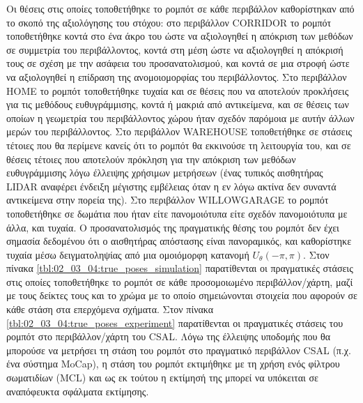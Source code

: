Οι θέσεις στις οποίες τοποθετήθηκε το ρομπότ σε κάθε περιβάλλον καθορίστηκαν
από το σκοπό της αξιολόγησης του στόχου: στο περιβάλλον CORRIDOR το ρομπότ
τοποθετήθηκε κοντά στο ένα άκρο του ώστε να αξιολογηθεί η απόκριση των μεθόδων
σε συμμετρία του περιβάλλοντος, κοντά στη μέση ώστε να αξιολογηθεί η απόκρισή
τους σε σχέση με την ασάφεια του προσανατολισμού, και κοντά σε μια στροφή ώστε
να αξιολογηθεί η επίδραση της ανομοιομορφίας του περιβάλλοντος. Στο περιβάλλον
HOME το ρομπότ τοποθετήθηκε τυχαία και σε θέσεις που να αποτελούν προκλήσεις
για τις μεθόδους ευθυγράμμισης, κοντά ή μακριά από αντικείμενα, και σε θέσεις
των οποίων η γεωμετρία του περιβάλλοντος χώρου ήταν σχεδόν παρόμοια με αυτήν
άλλων μερών του περιβάλλοντος. Στο περιβάλλον WAREHOUSE τοποθετήθηκε σε
στάσεις τέτοιες που θα περίμενε κανείς ότι το ρομπότ θα εκκινούσε τη λειτουργία
του, και σε θέσεις τέτοιες που αποτελούν πρόκληση για την απόκριση των μεθόδων
ευθυγράμμισης λόγω έλλειψης χρήσιμων μετρήσεων (ένας τυπικός αισθητήρας LIDAR
αναφέρει ένδειξη μέγιστης εμβέλειας όταν η εν λόγω ακτίνα δεν συναντά
αντικείμενα στην πορεία της). Στο περιβάλλον WILLOWGARAGE το ρομπότ
τοποθετήθηκε σε δωμάτια που ήταν είτε πανομοιότυπα είτε σχεδόν πανομοιότυπα με
άλλα, και τυχαία. Ο προσανατολισμός της πραγματικής θέσης του ρομπότ δεν έχει
σημασία δεδομένου ότι ο αισθητήρας απόστασης είναι πανοραμικός, και καθορίστηκε
τυχαία μέσω δειγματοληψίας από μια ομοιόμορφη κατανομή $U_\theta(-\pi,\pi)$.
Στον πίνακα \ref{tbl:02_03_04:true_poses_simulation} παρατίθενται οι
πραγματικές στάσεις στις οποίες τοποθετήθηκε το ρομπότ σε κάθε προσομοιωμένο
περιβάλλον/χάρτη, μαζί με τους δείκτες τους και το χρώμα με το οποίο
σημειώνονται στοιχεία που αφορούν σε κάθε στάση στα επερχόμενα σχήματα.  Στον
πίνακα \ref{tbl:02_03_04:true_poses_experiment} παρατίθενται οι πραγματικές
στάσεις του ρομπότ στο περιβάλλον/χάρτη του CSAL. Λόγω της έλλειψης υποδομής
που θα μπορούσε να μετρήσει τη στάση του ρομπότ στο πραγματικό περιβάλλον CSAL
(π.χ.  ένα σύστημα MoCap), η στάση του ρομπότ εκτιμήθηκε με τη χρήση ενός
φίλτρου σωματιδίων (MCL) και ως εκ τούτου η εκτίμησή της μπορεί να υπόκειται σε
αναπόφευκτα σφάλματα εκτίμησης.


